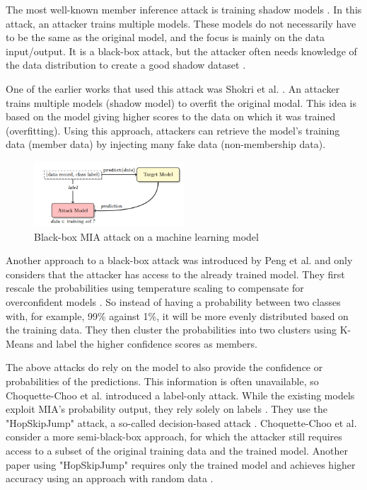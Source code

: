 The most well-known member inference attack is training shadow models \citep{rigaki_survey_2021}.
In this attack, an attacker trains multiple models.
These models do not necessarily have to be the same as the original model, and the focus is mainly on the data input/output.
It is a black-box attack, but the attacker often needs knowledge of the data distribution to create a good shadow dataset \citep{rigaki_survey_2021}.

One of the earlier works that used this attack was Shokri et al. \citep{shokri_membership_2017}.
An attacker trains multiple models (shadow model) to overfit the original modal.
This idea is based on the model giving higher scores to the data on which it was trained (overfitting).
Using this approach, attackers can retrieve the model's training data (member data) by injecting many fake data (non-membership data).
\begin{figure}[H]
  \includegraphics[width=0.5\textwidth]{TheorethicalFramework/AttacksOnPrivacy/shadow-models-mi.png}
  \caption{Black-box MIA attack on a machine learning model \citep{shokri_membership_2017}}
\end{figure}
Another approach to a black-box attack was introduced by Peng et al. and only considers that the attacker has access to the already trained model.
They first rescale the probabilities using temperature scaling to compensate for overconfident models \citep{peng_unsupervised_nodate}.
So instead of having a probability between two classes with, for example, 99\% against 1\%, it will be more evenly distributed based on the training data.
They then cluster the probabilities into two clusters using K-Means and label the higher confidence scores as members.

The above attacks do rely on the model to also provide the confidence or probabilities of the predictions.
This information is often unavailable, so Choquette-Choo et al. introduced a label-only attack.
While the existing models exploit MIA's probability output, they rely solely on labels \citep{choquette-choo_label-only_2021}.
They use the "HopSkipJump" attack, a so-called decision-based attack \citep{chen_hopskipjumpattack_2020}.
Choquette-Choo et al. consider a more semi-black-box approach, for which the attacker still requires access to a subset of the original training data and the trained model.
Another paper using "HopSkipJump" requires only the trained model and achieves higher accuracy using an approach with random data \citep{li_membership_2021}. \newline

